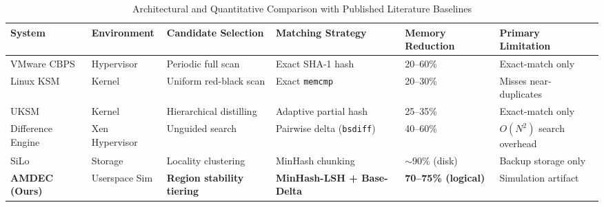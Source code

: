 \begin{table}[t]
\centering
\caption{Architectural and Quantitative Comparison with Published Literature Baselines}
\label{tab:baseline_comparison}
\small
\begin{tabular}{p{2.6cm}p{2.2cm}p{3.2cm}p{3.2cm}p{2.5cm}p{2.5cm}}
\hline
\textbf{System} & \textbf{Environment} & \textbf{Candidate Selection} & \textbf{Matching Strategy} & \textbf{Memory Reduction} & \textbf{Primary Limitation} \\
\hline
VMware CBPS~\cite{waldspurger2002} & Hypervisor & Periodic full scan & Exact SHA-1 hash & 20--60\% & Exact-match only \\
Linux KSM~\cite{arcangeli2009} & Kernel & Uniform red-black scan & Exact \texttt{memcmp} & 20--30\% & Misses near-duplicates \\
UKSM~\cite{xia2018} & Kernel & Hierarchical distilling & Adaptive partial hash & 25--35\% & Exact-match only \\
Difference Engine~\cite{gupta2008} & Xen Hypervisor & Unguided search & Pairwise delta (\texttt{bsdiff}) & 40--60\% & $O(N^2)$ search overhead \\
SiLo~\cite{xia2011} & Storage & Locality clustering & MinHash chunking & $\sim$90\% (disk) & Backup storage only \\
\textbf{AMDEC (Ours)} & Userspace Sim & \textbf{Region stability tiering} & \textbf{MinHash-LSH + Base-Delta} & \textbf{70--75\% (logical)} & Simulation artifact \\
\hline
\end{tabular}
\end{table}